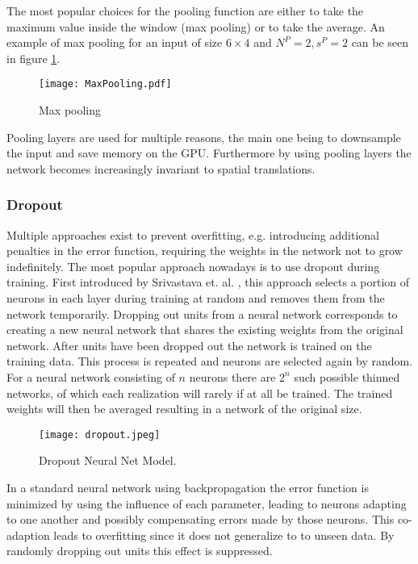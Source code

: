 The most popular choices for the pooling function are either to take the maximum value inside the window (max pooling) or to take the average. An example of max pooling for an input of size $6\times 4$ and $N^P = 2, s^P = 2$  can be seen in figure \ref{fig:MaxPooling}.\\

\begin{figure}[H]
\centering
\texttt{[image: MaxPooling.pdf]}
\caption{Max pooling}
\label{fig:MaxPooling}
\end{figure}

Pooling layers are used for multiple reasons, the main one being to downsample the input and save memory on the GPU. Furthermore by using pooling layers the network becomes increasingly invariant to spatial translations.

\subsubsection{Dropout}
Multiple approaches exist to prevent overfitting, e.g. introducing additional penalties in the error function, requiring the weights in the network not to grow indefinitely. The most popular approach nowadays is to use dropout during training. First introduced by Srivastava et. al. \cite{DropoutOriginal}, this approach selects a portion of neurons in each layer during training at random and removes them from the network temporarily. Dropping out units from a neural network corresponds to creating a new neural network that shares the existing weights from the original network. After units have been dropped out the network is trained on the training data. This process is repeated and neurons are selected again by random. For a neural network consisting of $n$ neurons there are $2^n$ such possible thinned networks, of which each realization will rarely if at all be trained. The trained weights will then be averaged resulting in a network of the original size. \\

\begin{figure}[H]
	\centering
	\texttt{[image: dropout.jpeg]}
	 \caption{Dropout Neural Net Model.}
 \label{DropoutDiagram}
\end{figure}

In a standard neural network using backpropagation the error function is minimized by using the influence of each parameter, leading to neurons adapting to one another and possibly compensating errors made by those neurons. This co-adaption leads to overfitting since it does not generalize to to unseen data. By randomly dropping out units this effect is suppressed. 


